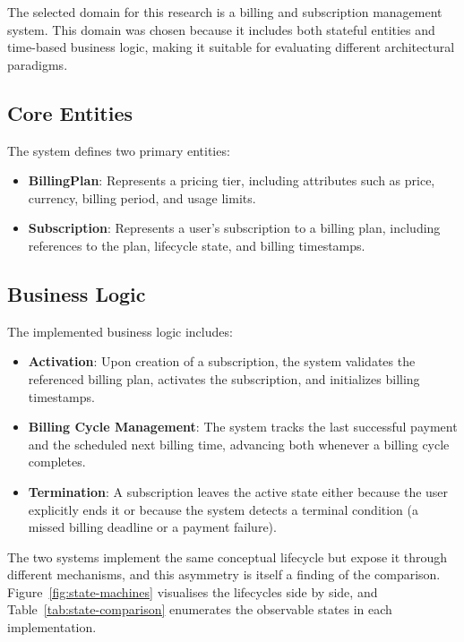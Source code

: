 The selected domain for this research is a billing and subscription management system. This domain was chosen because it includes both stateful entities and time-based business logic, making it suitable for evaluating different architectural paradigms.

\subsection{Core Entities}

The system defines two primary entities:

\begin{itemize}
    \item \textbf{BillingPlan}: Represents a pricing tier, including attributes such as price, currency, billing period, and usage limits.
    \item \textbf{Subscription}: Represents a user's subscription to a billing plan, including references to the plan, lifecycle state, and billing timestamps.
\end{itemize}

\subsection{Business Logic}

The implemented business logic includes:

\begin{itemize}
    \item \textbf{Activation}: Upon creation of a subscription, the system validates the referenced billing plan, activates the subscription, and initializes billing timestamps.
    \item \textbf{Billing Cycle Management}: The system tracks the last successful payment and the scheduled next billing time, advancing both whenever a billing cycle completes.
    \item \textbf{Termination}: A subscription leaves the active state either because the user explicitly ends it or because the system detects a terminal condition (a missed billing deadline or a payment failure).
\end{itemize}

The two systems implement the same conceptual lifecycle but expose it through different mechanisms, and this asymmetry is itself a finding of the comparison. Figure~\ref{fig:state-machines} visualises the lifecycles side by side, and Table~\ref{tab:state-comparison} enumerates the observable states in each implementation.

